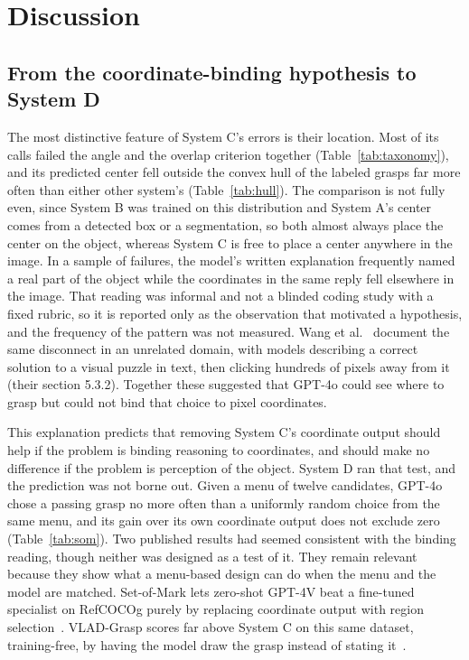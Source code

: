 \documentclass[12pt,letterpaper]{article}
\begin{document}
\section{Discussion}\label{sec:discussion}

\subsection{From the coordinate-binding hypothesis to System D}

The most distinctive feature of System C's errors is their location.
Most of its calls failed the angle and the overlap criterion together
(Table~\ref{tab:taxonomy}), and its predicted center fell outside the
convex hull of the labeled grasps far more often than either other
system's (Table~\ref{tab:hull}). The comparison is not fully even, since
System B was trained on this distribution and System A's center comes
from a detected box or a segmentation, so both almost always place the
center on the object, whereas System C is free to place a center
anywhere in the image. In a sample of failures, the model's written
explanation frequently named a real part of the object while the
coordinates in the same reply fell elsewhere in the image. That reading
was informal and not a blinded coding study with a fixed rubric, so it
is reported only as the observation that motivated a hypothesis, and the
frequency of the pattern was not measured. Wang et al.~\cite{wang2025}
document the same disconnect in an unrelated domain, with models
describing a correct solution to a visual puzzle in text, then clicking
hundreds of pixels away from it (their section 5.3.2). Together these
suggested that GPT-4o could see where to grasp but could not bind that
choice to pixel coordinates.

This explanation predicts that removing System C's coordinate output
should help if the problem is binding reasoning to coordinates, and
should make no difference if the problem is perception of the object.
System D ran that test, and the prediction was not borne out. Given a
menu of twelve candidates, GPT-4o chose a passing grasp no more often
than a uniformly random choice from the same menu, and its gain over its
own coordinate output does not exclude zero (Table~\ref{tab:som}). Two
published results had seemed consistent with the binding reading, though
neither was designed as a test of it. They remain relevant because they
show what a menu-based design can do when the menu and the model are
matched. Set-of-Mark lets zero-shot GPT-4V beat a fine-tuned specialist
on RefCOCOg purely by replacing coordinate output with region
selection~\cite{yang2024}. VLAD-Grasp scores far above System C on this
same dataset, training-free, by having the model draw the grasp instead
of stating it~\cite{kulshrestha2025}.
\end{document}
